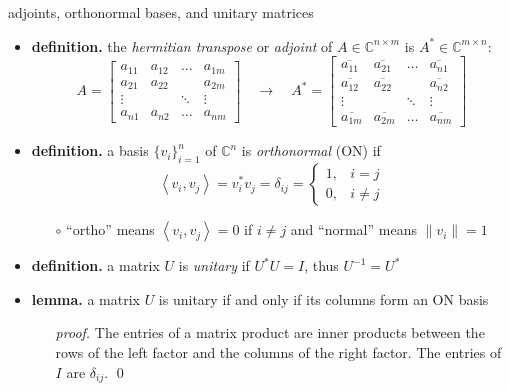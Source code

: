 \documentclass[10pt,hyperref]{beamer}
\newcommand{\CC}{\mathbb{C}}
\newcommand{\ip}[2]{\left<#1,#2\right>}
\newcommand{\bqed}{{\color{blue}\qed}}
\begin{document}
\begin{frame}{adjoints, orthonormal bases, and unitary matrices}

\begin{itemize}
\item \textbf{definition.} the \emph{hermitian transpose} or \emph{adjoint} of $A\in \CC^{n\times m}$ is $A^* \in \CC^{m\times n}$:
    $$A = \begin{bmatrix}
    a_{11} & a_{12} & \dots & a_{1m} \\
    a_{21} & a_{22} &       & a_{2m} \\
    \vdots &        & \ddots& \vdots \\
    a_{n1} & a_{n2} & \dots & a_{nm} \end{bmatrix}
    \quad \to \quad
    A^* = \begin{bmatrix}
    \overline{a_{11}} & \overline{a_{21}} & \dots & \overline{a_{n1}} \\
    \overline{a_{12}} & \overline{a_{22}} &       & \overline{a_{n2}} \\
    \vdots            &                   & \ddots& \vdots \\
    \overline{a_{1m}} & \overline{a_{2m}} & \dots & \overline{a_{nm}} \end{bmatrix}$$
\item \textbf{definition.} a basis $\{v_i\}_{i=1}^n$ of $\CC^n$ is \emph{orthonormal} (ON) if
\small
    $$\ip{v_i}{v_j} =v_i^* v_j = \delta_{ij} = \begin{cases} 1, & i=j \\ 0, & i\ne j \end{cases}$$
\normalsize
\vspace{-2mm}
    \begin{itemize}
    \item[$\circ$] ``ortho'' means $\ip{v_i}{v_j}=0$ if $i\ne j$ and ``normal'' means $\|v_i\|=1$
    \end{itemize}
\item \textbf{definition.} a matrix $U$ is \emph{unitary} if $U^* U = I$, thus $U^{-1}=U^*$
\item \textbf{lemma.} a matrix $U$ is unitary if and only if its columns form an ON basis
    \begin{itemize}
    \item[\emph{proof.}] The entries of a matrix product are inner products between the rows of the left factor and the columns of the right factor.  The entries of $I$ are $\delta_{ij}$. \bqed
    \end{itemize}
\end{itemize}
\end{frame}
\end{document}
